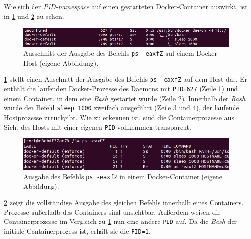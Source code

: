 \documentclass[../main.tex]{subfiles}
\begin{document}
			Wie sich der \emph{\acrshort{PID}-namespace} auf einen gestarteten Docker-Container auswirkt, ist in \fig \ref{fig:sec_pidNsHost} und \fig \ref{fig:sec_pidNsContainer} zu sehen.

			\begin{figure}[h]
					\centering
					\includegraphics[width=1.0\textwidth]{./images/sec_pidNsHost.jpg}
					\caption{Ausschnitt der Ausgabe des Befehls \texttt{ps -eaxfZ} auf einem Docker-Host (eigene Abbildung).}
					\label{fig:sec_pidNsHost}
			\end{figure}

			\fig \ref{fig:sec_pidNsHost} stellt einen Auschnitt der Ausgabe des Befehls \texttt{ps -eaxfZ} auf dem Host dar. Er enthält die laufenden Docker-Prozesse des Daemons mit \texttt{PID=627} (Zeile 1) und einem Container, in dem eine \emph{Bash} gestartet wurde (Zeile 2). Innerhalb der \emph{Bash} wurde der Befehl \texttt{sleep 1000} zweifach ausgeführt (Zeile 3 und 4), der laufende Hostprozesse zurückgibt. Wie zu erkennen ist, sind die Containerprozesse aus Sicht des Hosts mit einer eigenen \texttt{PID} vollkommen transparent.

			\begin{figure}[h]
					\centering
					\includegraphics[width=1.0\textwidth]{./images/sec_pidNsContainer.jpg}
					\caption{Ausgabe des Befehls \texttt{ps -eaxfZ} in einem Docker-Container (eigene Abbildung).}
					\label{fig:sec_pidNsContainer}
			\end{figure}

			\fig \ref{fig:sec_pidNsContainer} zeigt die vollständige Ausgabe des gleichen Befehls innerhalb eines Containers. Prozesse außerhalb des Containers sind unsichtbar. Außerdem weisen die Containerprozesse im Vergleich zu \fig \ref{fig:sec_pidNsHost} nun eine andere \texttt{PID} auf. Da die \emph{Bash} der initiale Containerprozess ist, erhält sie die \texttt{PID=1}.




\end{document}
